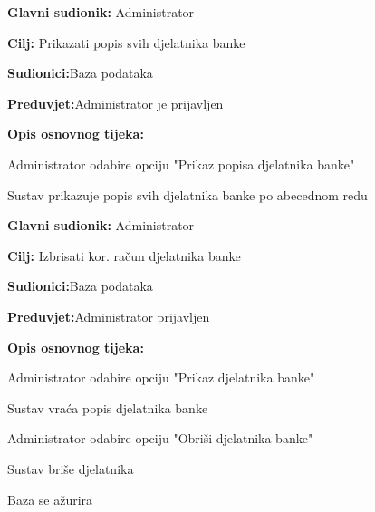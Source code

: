 \eject
\noindent {}

\begin{packed_item}
	
	\item \textbf{Glavni sudionik: }{Administrator}
	\item  \textbf{Cilj:} {Prikazati popis svih djelatnika banke}
	\item  \textbf{Sudionici:}{Baza podataka} 
	\item  \textbf{Preduvjet:}{Administrator je prijavljen}
	\item  \textbf{Opis osnovnog tijeka:}
	
	\item[] \begin{packed_enum}
		
		\item {Administrator odabire opciju "Prikaz popisa djelatnika banke"}
		\item {Sustav prikazuje popis svih djelatnika banke po abecednom redu}
		\end{packed_enum}
\end{packed_item}


\noindent {}

\begin{packed_item}
	\item \textbf{Glavni sudionik: }{Administrator}
	\item  \textbf{Cilj:} {Izbrisati kor. račun djelatnika banke}
	\item  \textbf{Sudionici:}{Baza podataka}
	\item  \textbf{Preduvjet:}{Administrator prijavljen}
	\item  \textbf{Opis osnovnog tijeka:}
	
	\item[] \begin{packed_enum}
		
		\item {Administrator odabire opciju "Prikaz djelatnika banke"}
		\item {Sustav vraća popis djelatnika banke}
		\item {Administrator odabire opciju "Obriši djelatnika banke"}
		\item {Sustav briše djelatnika}
		\item {Baza se ažurira}
	\end{packed_enum}
	
\end{packed_item}


